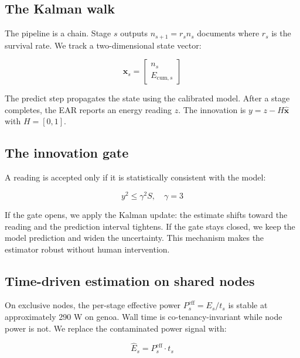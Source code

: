 \documentclass[12pt,a4paper]{article}
\begin{document}
\subsection{The Kalman walk}
\label{sec:ekf}

The pipeline is a chain. Stage $s$ outputs $n_{s+1} = r_s n_s$ documents where $r_s$ is the survival rate. We track a two-dimensional state vector:

\begin{equation}
  \mathbf{x}_s = \begin{bmatrix} n_s \\ E_{\mathrm{cum},s} \end{bmatrix}
  \label{eq:state}
\end{equation}

The predict step propagates the state using the calibrated model. After a stage completes, the EAR reports an energy reading $z$. The innovation is $y = z - H\hat{\mathbf{x}}$ with $H = [0,1]$.

\subsection{The innovation gate}

A reading is accepted only if it is statistically consistent with the model:

\begin{equation}
  y^2 \leq \gamma^2 S, \quad \gamma = 3
  \label{eq:gate}
\end{equation}

If the gate opens, we apply the Kalman update: the estimate shifts toward the reading and the prediction interval tightens. If the gate stays closed, we keep the model prediction and widen the uncertainty. This mechanism makes the estimator robust without human intervention.

\subsection{Time-driven estimation on shared nodes}

On exclusive nodes, the per-stage effective power $P^{\mathrm{eff}}_s = E_s / t_s$ is stable at approximately 290 W on genoa. Wall time is co-tenancy-invariant while node power is not. We replace the contaminated power signal with:

\begin{equation}
  \hat{E}_s = P^{\mathrm{eff}}_s \cdot t_s
  \label{eq:timedriven}
\end{equation}
\end{document}
